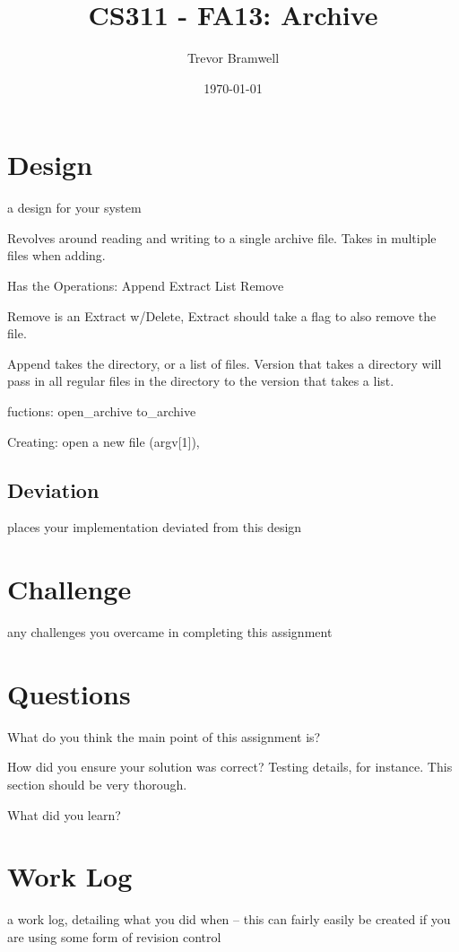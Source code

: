 \documentclass[letterpaper,10pt]{article}
\title{CS311 - FA13: Archive}
\date{\today}
\author{Trevor Bramwell}
\begin{document}
\maketitle

\section{Design}
    a design for your system

    Revolves around reading and writing to a single archive file. Takes in
    multiple files when adding.

    Has the Operations:
        Append
        Extract
        List
        Remove

    Remove is an Extract w/Delete, Extract should take a flag to also remove
    the file.

    Append takes the directory, or a list of files. Version that takes a
    directory will pass in all regular files in the directory to the version
    that takes a list.
        
    fuctions:
        open_archive
        to_archive

    Creating:
        open a new file (argv[1]), 

\subsection{Deviation}
    places your implementation deviated from this design

\section{Challenge}
    any challenges you overcame in completing this assignment

\section{Questions}
\begin{description}
  \item  What do you think the main point of this assignment is?
  \item  How did you ensure your solution was correct? Testing details, for
         instance. This section should be very thorough.
  \item  What did you learn?
\end{description}

\section{Work Log}
    a work log, detailing what you did when -- this can fairly easily be
    created if you are using some form of revision control
\end{document}
